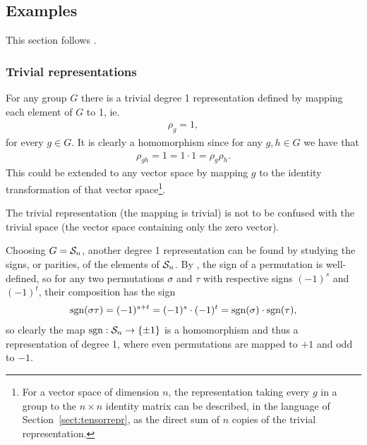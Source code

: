 \subsection{Examples}\label{sect:basicreprs}

This section follows \cite[1.2]{Serre}.

\subsubsection{Trivial representations}


\begin{example}
	For any group $G$ there is a trivial degree 1 representation defined by mapping each element of $G$ to 1, ie.
	\begin{align*}
		\rho_g = 1,
	\end{align*}
	for every $g \in G$. It is clearly a homomorphism since for any $g,h \in G$ we have that
	\begin{align*}
		\rho_{gh} = 1 = 1 \cdot 1 = \rho_g \rho_h.
	\end{align*}
	This could be extended to any vector space by mapping $g$ to the identity transformation of that vector space\footnote{For a vector space of dimension $n$, the representation taking every $g$ in a group to the $n \times n$ identity matrix can be described, in the language of Section~\ref{sect:tensorrepr}, as the direct sum of $n$ copies of the trivial representation.}.
\end{example}

\begin{note}
	The trivial representation (the mapping is trivial) is not to be confused with the trivial space (the vector space containing only the zero vector).
\end{note}

\begin{example}
	Choosing $G = \mathcal{S}_n$, another degree 1 representation can be found by studying the signs, or parities, of the elements of $\mathcal{S}_n$. By \cite[Thm.12.6.1.]{Biggs}, the sign of a permutation is well-defined, so for any two permutations $\sigma$ and $\tau$ with respective signs $(-1)^s$ and $(-1)^t$, their composition has the sign
	\begin{align*}
		\text{sgn}(\sigma\tau) = (-1)^{s+t} = (-1)^s \cdot (-1)^t = \text{sgn} (\sigma) \cdot \text{sgn} (\tau),
	\end{align*}
	so clearly the map $\text{sgn}: \mathcal{S}_n \rightarrow \{\pm 1\}$ is a homomorphism and thus a representation of degree 1, where even permutations are mapped to $+1$ and odd to $-1$.
\end{example}

